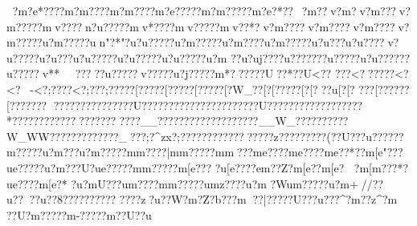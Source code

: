 {{{{{{{{{{{{{{{{{{{{{{{{{{{{{{{{{{{{{{{{{{{{{{{{{{{{{{{{{{{{{{{{{{{{{{{{{{{{{{{{{{{{{{{{{{{{{{{{{{{{{{{{{{{{{{{{{{{{{{{{{{{{{{{{{{{{{{{{{{{{{{{{{{{{{{{{{{{{{{{{{{{{{{{{{{{{{{{{{{{{{{{{{{{{{{{{{{{{{{{{{{{{{{{{{{{{{{{{{{{{{{{{{{{{{{{{{{{{{{{{{{{{{{{{{{{{{{{{{{{{{{{{{{{{{{{{{{{{{{{{{{{{{{{{{{{{{{{{{{{{{{{{{{{{{{{{{{{{{{{{{{{{{{{{{{{{{{{{{{{{{{{{{{{{{{{{{{{{{{{{{{{{{{{{{{{{{{{{{{{{{{{{{{{{{{{{{{{{{{{{{{{{{{{{{{{{{{{{{{{{{{{{{{{{{{{{{{{{{{{{{{{{{{{{{{{{{{{{{{{{{{{{{{{{{{{{{{{{{{{{{{{{{{{{{{{{{{{{{{{{{{{{{{{{{{{{{{{{{{{{{{{{{{{{{{{{{{{{{{{{{{{{{{{{{{{{{{{{{{{{{{{{{{{{{{{{{{{{{{{{{{{{{{{{{{{{{{{{{{{{{{{{{{{{{{{{{{{{{{{{{{{{{{{{{{{{{{{{{{{{{{{{{{{{{{{{{{{{{{{{{{{{{{{{{{{{{{{{{{{{{{{{{{{{{{{{{{{{{{{{{{{{{{{{{{{{{{{{{{{{{{{{{{{{{{{{{{{{{{{{{{{{{{{{{{{{{{{{{{{{{{{{{{{{{{{{{{{{{{{{{{{{{{{{{{{{{{{{{{{{{{{{{{{{{{{{{{{{{{{{{{{{{{{{{{{{{{{{{{{{{{{{{{{{{{{{{{{{{{{{{{{{{{{{{{{{{{{{{{{{{{{{{{{{{{{{{{{{{{{{{{{{{{{{{{{{{{{{{{{{{{{{{{{{{{{{{{{{{{{{{{{{{{{{{{{{{{{{{{{{{{{{{{{{{{{{{{{{{{{{{{{{{{{{{{{{{{{{{{{{{{{{{{{{{{{{{{{{{{{{{{{{{{{{{{{{{{{{{{{{{{{{{{{{{{{{{{{{{{{{{{{{{{{{{{{{{{{{{{{{{{{{{{{{{{{{{{{{{{{{{{{{{{{{{{{{{{{{{{{{{{{{{{{{{{{{{{{{{{{{{{{{{{{{{{{{{{{{{{{{{{{{{{{{{{{{{{{{{{{{{{{{{{{{{{{{{{{{{{{{{{{{{{{{{{{{{{{{{{{{{{{{{{{{{{{{{{{{{{{{{{{{{{{{{{{{{{{{{{{{{{{{{{{{{{{{{{{{{{{{{{{{{{{{{{{{{{{{{{{{{{{{{{{{{{{{{{{{{{{{{{{{{{{{{{{{{{{{{{{{{{{{{{{{{{{{{{{{{{{{{{{{{{{{{{{{{{{{{{{{{{{{{{{{{{{{{{{{{{{{{{{{{{{{{{{{{{{{{{{{{{{{{{{{{{{{{{{{{{{{{{{{{{{{{{{{{{{{{{{{{{{{{{{{{{{{{{{{{{{{{{{{{{{{{{{{{{{{{{{{{{{{{{{{{{{{{{{{{{{{{{{{{{{{{{{{{{{{{{{{{{{{{{{{{{{{{{{{{{{{{{{{{{{{{{{{{{{{{{{{{{{{{{{{{{{{{{{{{{{{{{{{{{{{{{{{{{{{{{{{{{{{{{{{{{{{{{{{{{{{{{{{{{{{{{{{{{{{{{{{{{{{{{{{{{{{{{{{{{{{{{{{{{{{{{{{{{{{{{{{{{{{{{{{{{{{{{{{{{{{{{{{{{{{{{{{{{{{{{{{{{{{{{{{{{{{{{{{{{{{{{{{{{{{{{{{{{{{{{{{{{{{{{{{{{{{{{{{{{{{{{{{{{{{{{{{{{{{{{{{{{{{{{{{{{{{{{{{{{?m?e*????m?m????m?m????m?e?????m?m?????m?e?*??~?m??v?m? v?m??? v?m?????mv????n?u?????mv*????mv?????mv??*?v?m????v?m????v?m????v?m?????u?m?????un"?*"?u?u?????u?m?????u?m????u?m?????u?u???u?u????v?u?????u?u???u?u?????u?u?????u?u?????u?m 
? ?u?uj????u?}?????}?u?????u?u?????}?u?????}v**
~?}???}?u?????}v?????u?}j????}?m  *???}???U??}*??U<??}
???<??????<?<?-<?;??? ?<?;???\?;?????\?[?????\?[?????\?[?????\?[?W_??[?[?????[?[???u[?[? 
??{?[?????{?[?????{?{?
????{???????{????U??????????????????????U??????????????????
*??????  ??????  ???????????__}???????????????????__W_??????????W_WW??{?? ? ??{?????{?_??{?;?^zx?;???????????? ???}??z??}????  ???}(??U???u?????}?m?????u?m???u?m?????m{m????|m{m?????m{m???{m{e????{m{e????{m{e??*??m[e "???u{e?????u?m???U?u{e?????m{m?????m[e???
?u[e????{e{m??Z?{m[e??  {m[e?
?m[m???*?u{e????{m[e?*  ?u?mU???u{m????m{m?????u{mz????u?m
?W\?u{m?????u?m+//?}?u???}?u??8 ???}???????}%
???}?z^^?}?u ??W?}{m?Z?b???m??|??}???U???u???^?}{m??z^?}{m
??U?}{m?????}{m-?????{m ??U??u }}}}}}}}}}}}}}}}}}}}}}}}}}}}}}}}}}}}}}}}}}}}}}}}}}}}}}}}}}}}}}}}}}}}}}}}}}}}}}}}}}}}}}}}}}}}}}}}}}}}}}}}}}}}}}}}}}}}}}}}}}}}}}}}}}}}}}}}}}}}}}}}}}}}}}}}}}}}}}}}}}}}}}}}}}}}}}}}}}}}}}}}}}}}}}}}}}}}}}}}}}}}}}}}}}}}}}}}}}}}}}}}}}}}}}}}}}}}}}}}}}}}}}}}}}}}}}}}}}}}}}}}}}}}}}}}}}}}}}}}}}}}}}}}}}}}}}}}}}}}}}}}}}}}}}}}}}}}}}}}}}}}}}}}}}}}}}}}}}}}}}}}}}}}}}}}}}}}}}}}}}}}}}}}}}}}}}}}}}}}}}}}}}}}}}}}}}}}}}}}}}}}}}}}}}}}}}}}}}}}}}}}}}}}}}}}}}}}}}}}}}}}}}}}}}}}}}}}}}}}}}}}}}}}}}}}}}}}}}}}}}}}}}}}}}}}}}}}}}}}}}}}}}}}}}}}}}}}}}}}}}}}}}}}}}}}}}}}}}}}}}}}}}}}}}}}}}}}}}}}}}}}}}}}}}}}}}}}}}}}}}}}}}}}}}}}}}}}}}}}}}}}}}}}}}}}}}}}}}}}}}}}}}}}}}}}}}}}}}}}}}}}}}}}}}}}}}}}}}}}}}}}}}}}}}}}}}}}}}}}}}}}}}}}}}}}}}}}}}}}}}}}}}}}}}}}}}}}}}}}}}}}}}}}}}}}}}}}}}}}}}}}}}}}}}}}}}}}}}}}}}}}}}}}}}}}}}}}}}}}}}}}}}}}}}}}}}}}}}}}}}}}}}}}}}}}}}}}}}}}}}}}}}}}}}}}}}}}}}}}}}}}}}}}}}}}}}}}}}}}}}}}}}}}}}}}}}}}}}}}}}}}}}}}}}}}}}}}}}}}}}}}}}}}}}}}}}}}}}}}}}}}}}}}}}}}}}}}}}}}}}}}}}}}}}}}}}}}}}}}}}}}}}}}}}}}}}}}}}}}}}}}}}}}}}}}}}}}}}}}}}}}}}}}}}}}}}}}}}}}}}}}}}}}}}}}}}}}}}}}}}}}}}}}}}}}}}}}}}}}}}}}}}}}}}}}}}}}}}}}}}}}}}}}}}}}}}}}}}}}}}}}}}}}}}}}}}}}}}}}}}}}}}}}}}}}}}}}}}}}}}}}}}}}}}}}}}}}}}}}}}}}}}}}}}}}}}}}}}}}}}}}}}}}}}}}}}}}}}}}}}}}}}}}}}}}}}}}}}}}}}}}}}}}}}}}}}}}}}}}}}}}}}}}}}}}}}}}}}}}}}}}}}}}}}}}}}}}}}}}}}}}}}}}}}}}}}}}}}}}}}}}}}}}}}}}}}}}}}}}}}}}}}}}}}}}}}}}}}}}}}}}}}}}}}}}}}}}}}}}}}}}}}}}}}}}}}}}}}}}}}}}}}}}}}}}}}}}}}}}}}}}}}}}}}}}}}}}}}}}}}}}}}}}}}}}}}}}}}}}}}}}}}}}}}}}}}}}}}}}}}}}}}}}}}}}}}}}}}}}}}}}}}}}}}}}}}}}}}}}}}}}}}}}}}}}}}}}}}}}}}}}}}}}}}}}}}}}}}}}}}}}}}}}}}}}}}}}}}}}}}}}}}}}}}}}}}}}}}}}}}}}}}}}}}}}}}}}}}}}}}}}}}}}}}}}}}}}}}}}}}}}}}}}}}}}}}}}}}}}}}}}}}}}}}}}}}}}}}}}}}}}}}}}}}}}}}}}}}}}}}}}}}}}}}}}}}}}}}}}}}}}}}}}}}}}}}}}}}}}}}}}}}}}}}}}}}}}}}}}}}}}}}}}}}}}}}}}}}}}}}}}}}}}}}}}}}}}}}}}}}}}}}}}}}}}}}}}}}}}}}}}}}}}}}}}}}}}}}}}}}}}}}}}}}}}}}}}}}}}}}}}}}}
